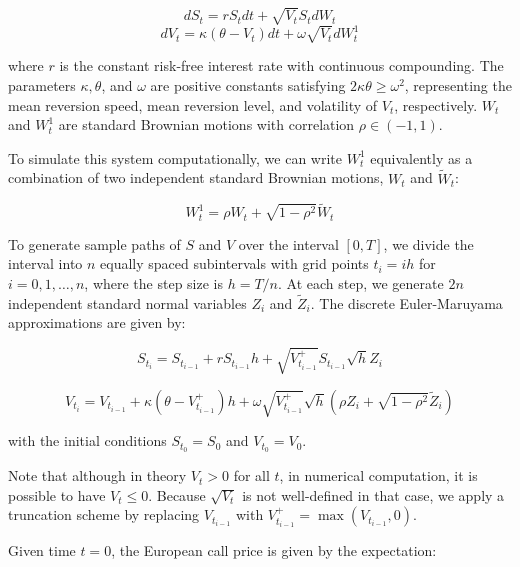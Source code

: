 \documentclass[a4paper,11pt, titlepage]{article}
\theoremstyle{definition}
\theoremstyle{plain}
\theoremstyle{remark}
\begin{document}
\begin{equation}
dS_t = r S_t dt + \sqrt{V_t} S_t dW_t
\end{equation}
\begin{equation}
dV_t = \kappa(\theta - V_t) dt + \omega \sqrt{V_t} dW_t^1
\end{equation}

where $r$ is the constant risk-free interest rate with continuous compounding. The parameters $\kappa, \theta$, and $\omega$ are positive constants satisfying $2\kappa\theta \ge \omega^2$, representing the mean reversion speed, mean reversion level, and volatility of $V_t$, respectively. $W_t$ and $W_t^1$ are standard Brownian motions with correlation $\rho \in (-1, 1)$. 

To simulate this system computationally, we can write $W_t^1$ equivalently as a combination of two independent standard Brownian motions, $W_t$ and $\tilde{W}_t$:

\begin{equation}
W_t^1 = \rho W_t + \sqrt{1 - \rho^2} \tilde{W}_t
\end{equation} 

To generate sample paths of $S$ and $V$ over the interval $[0, T]$, we divide the interval into $n$ equally spaced subintervals with grid points $t_i = i h$ for $i=0, 1, \dots, n$, where the step size is $h = T/n$. At each step, we generate $2n$ independent standard normal variables $Z_i$ and $\tilde{Z}_i$. The discrete Euler-Maruyama approximations are given by:

\begin{equation}
S_{t_i} = S_{t_{i-1}} + r S_{t_{i-1}} h + \sqrt{V_{t_{i-1}}^+} S_{t_{i-1}} \sqrt{h} Z_i
\end{equation}

\begin{equation}
V_{t_i} = V_{t_{i-1}} + \kappa(\theta - V_{t_{i-1}}^+) h + \omega \sqrt{V_{t_{i-1}}^+} \sqrt{h} (\rho Z_i + \sqrt{1 - \rho^2} \tilde{Z}_i)
\end{equation}

with the initial conditions $S_{t_0} = S_0$ and $V_{t_0} = V_0$. 

Note that although in theory $V_t > 0$ for all $t$, in numerical computation, it is possible to have $V_t \le 0$. Because $\sqrt{V_t}$ is not well-defined in that case, we apply a truncation scheme by replacing $V_{t_{i-1}}$ with $V_{t_{i-1}}^+ = \max(V_{t_{i-1}}, 0)$.

Given time $t=0$, the European call price is given by the expectation:
\end{document}
